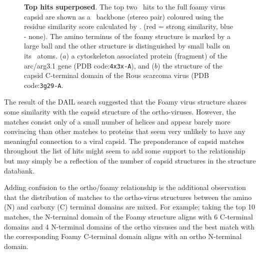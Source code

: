 \begin{figure}
\centering
{}
\begin{footnotesize}
\caption{
\label{Fig:top2}
{\bf Top hits superposed}.
The top two \DALI\ hits to the full foamy virus capsid are shown as a \CA\ backbone (stereo pair) coloured using
the residue similarity score calculated by \SAP. (red = strong similarity, blue - none).
The amino terminus of the foamy structure is marked by a large ball and the other structure is distinguished
by small balls on its \CA\ atoms.
($a$) a cytoskeleton associated protein (fragment) of the arc/arg3.1 gene (PDB code:{\tt 4x3x-A}),
and 
($b$) the structure of the capsid C-terminal domain of the Rous scarcoma virus (PDB code:{\tt 3g29-A}. 
}
\end{footnotesize}
\end{figure}

The result of the DAIL search suggested that the Foamy virus structure shares some similarity with the
capsid structure of the ortho-viruses.  However, the matches consist only of a small number of
helices and appear barely more convincing than other matches to proteins that seem very unlikely
to have any meaningful connection to a viral capsid.   The preponderance of capsid matches
throughout the list of hits might seem to add some support to the relationship but may simply be 
a reflection of the number of capsid structures in the structure databank.

Adding confusion to the ortho/foamy relationship is the additional observation that 
the distribution of matches to the ortho-virus structures between the amino (N) and carboxy
(C) terminal domains are mixed.   For example; taking the top 10 matches, the N-terminal domain of the Foamy
structure aligns with 6 C-terminal domains and 4 N-terminal domains of the ortho virsuses
and the best match with the corresponding Foamy C-terminal domain aligns with an ortho N-terminal domain.

